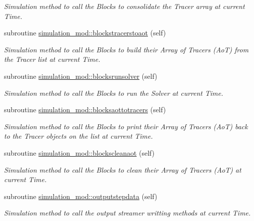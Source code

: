 \begin{DoxyCompactItemize}
\begin{DoxyCompactList}\small\item\em Simulation method to call the Blocks to consolidate the Tracer array at current Time. \end{DoxyCompactList}\item 
subroutine \mbox{\hyperlink{namespacesimulation__mod_a624d5b402a8d359219839841862ab307}{simulation\+\_\+mod\+::blockstracerstoaot}} (self)
\begin{DoxyCompactList}\small\item\em Simulation method to call the Blocks to build their Array of Tracers (AoT) from the Tracer list at current Time. \end{DoxyCompactList}\item 
subroutine \mbox{\hyperlink{namespacesimulation__mod_ab2e7a1b0f131ab6fe40454d32cb3e24f}{simulation\+\_\+mod\+::blocksrunsolver}} (self)
\begin{DoxyCompactList}\small\item\em Simulation method to call the Blocks to run the Solver at current Time. \end{DoxyCompactList}\item 
subroutine \mbox{\hyperlink{namespacesimulation__mod_a03afd8682d3239c0ce8eb1637e4da806}{simulation\+\_\+mod\+::blocksaottotracers}} (self)
\begin{DoxyCompactList}\small\item\em Simulation method to call the Blocks to print their Array of Tracers (AoT) back to the Tracer objects on the list at current Time. \end{DoxyCompactList}\item 
subroutine \mbox{\hyperlink{namespacesimulation__mod_a9c7e093e5cf65d3414f9a8cf8beab611}{simulation\+\_\+mod\+::blockscleanaot}} (self)
\begin{DoxyCompactList}\small\item\em Simulation method to call the Blocks to clean their Array of Tracers (AoT) at current Time. \end{DoxyCompactList}\item 
subroutine \mbox{\hyperlink{namespacesimulation__mod_a5735e9ecb39f15061f3d766b0de7809d}{simulation\+\_\+mod\+::outputstepdata}} (self)
\begin{DoxyCompactList}\small\item\em Simulation method to call the output streamer writting methods at current Time. \end{DoxyCompactList}\item 

\end{DoxyCompactItemize}

